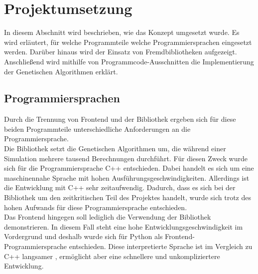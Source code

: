 
\section{Projektumsetzung}
In diesem Abschnitt wird beschrieben, wie das Konzept umgesetzt wurde.
Es wird erläutert, für welche Programmteile welche Programmiersprachen eingesetzt werden. Darüber hinaus wird der Einsatz von Fremdbibliotheken aufgezeigt.
Anschließend wird mithilfe von  Programmcode-Ausschnitten die Implementierung der Genetischen Algorithmen erklärt.

\subsection{Programmiersprachen}
Durch die Trennung von Frontend und der Bibliothek ergeben sich für diese beiden Programmteile unterschiedliche Anforderungen an die Programmiersprache.\\
Die Bibliothek setzt die Genetischen Algorithmen um, die während einer Simulation mehrere tausend Berechnungen durchführt. Für diesen Zweck wurde sich für die Programmiersprache C++ entschieden.
Dabei handelt es sich um eine maschinennahe Sprache mit hohen Ausführungsgeschwindigkeiten. Allerdings ist die Entwicklung mit C++ sehr zeitaufwendig. Dadurch, dass es sich bei der Bibliothek um den zeitkritischen Teil des Projektes handelt, 
wurde sich trotz des hohen Aufwands für diese Programmiersprache entschieden.\\
Das Frontend hingegen soll lediglich die Verwendung der Bibliothek demonstrieren. In diesem Fall steht eine hohe Entwicklungsgeschwindigkeit im Vordergrund und deshalb wurde sich für Python als Frontend-Programmiersprache entschieden. 
Diese interpretierte Sprache ist im Vergleich zu C++ langsamer \cite{benchmarks}, ermöglicht aber eine schnellere und unkompliziertere Entwicklung.

